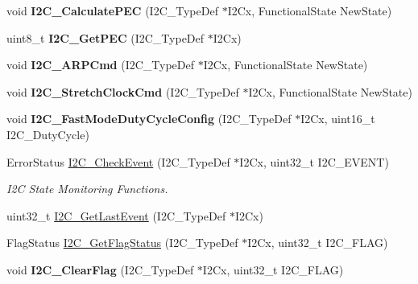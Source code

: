 \begin{DoxyCompactItemize}
\item 
\hypertarget{group__I2C__Exported__Functions_gae86801251359226c35745e0a258388b0}{
void {\bfseries I2C\_\-CalculatePEC} (I2C\_\-TypeDef $\ast$I2Cx, FunctionalState NewState)}
\label{group__I2C__Exported__Functions_gae86801251359226c35745e0a258388b0}

\item 
\hypertarget{group__I2C__Exported__Functions_ga7bf75e7c27c0e1d73e70fc0e1c7cd1dd}{
uint8\_\-t {\bfseries I2C\_\-GetPEC} (I2C\_\-TypeDef $\ast$I2Cx)}
\label{group__I2C__Exported__Functions_ga7bf75e7c27c0e1d73e70fc0e1c7cd1dd}

\item 
\hypertarget{group__I2C__Exported__Functions_ga66d86742bf1be58b17ef8779ffc79d02}{
void {\bfseries I2C\_\-ARPCmd} (I2C\_\-TypeDef $\ast$I2Cx, FunctionalState NewState)}
\label{group__I2C__Exported__Functions_ga66d86742bf1be58b17ef8779ffc79d02}

\item 
\hypertarget{group__I2C__Exported__Functions_ga7459feb3b1dfcd3e4f6574002ca7d3bd}{
void {\bfseries I2C\_\-StretchClockCmd} (I2C\_\-TypeDef $\ast$I2Cx, FunctionalState NewState)}
\label{group__I2C__Exported__Functions_ga7459feb3b1dfcd3e4f6574002ca7d3bd}

\item 
\hypertarget{group__I2C__Exported__Functions_gaa570f76bc34e5b0531b29b1a90af1275}{
void {\bfseries I2C\_\-FastModeDutyCycleConfig} (I2C\_\-TypeDef $\ast$I2Cx, uint16\_\-t I2C\_\-DutyCycle)}
\label{group__I2C__Exported__Functions_gaa570f76bc34e5b0531b29b1a90af1275}

\item 
ErrorStatus \hyperlink{group__I2C__Exported__Functions_ga2d5701342f9d4c1f09bf9d3cdcacc326}{I2C\_\-CheckEvent} (I2C\_\-TypeDef $\ast$I2Cx, uint32\_\-t I2C\_\-EVENT)
\begin{DoxyCompactList}\small\item\em I2C State Monitoring Functions. \item\end{DoxyCompactList}\item 
uint32\_\-t \hyperlink{group__I2C__Exported__Functions_ga29237aea9b5a3ead33167e1d027e9f1a}{I2C\_\-GetLastEvent} (I2C\_\-TypeDef $\ast$I2Cx)
\item 
FlagStatus \hyperlink{group__I2C__Exported__Functions_ga15c95d0ed124f029621a2061b1677ee7}{I2C\_\-GetFlagStatus} (I2C\_\-TypeDef $\ast$I2Cx, uint32\_\-t I2C\_\-FLAG)
\item 
\hypertarget{group__I2C__Exported__Functions_ga9d4f8fe9f7232696114b5578b1223963}{
void {\bfseries I2C\_\-ClearFlag} (I2C\_\-TypeDef $\ast$I2Cx, uint32\_\-t I2C\_\-FLAG)}
\label{group__I2C__Exported__Functions_ga9d4f8fe9f7232696114b5578b1223963}


\end{DoxyCompactItemize}

